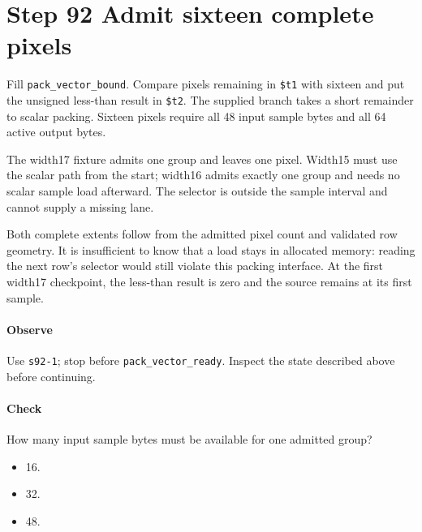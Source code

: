 \section{Step 92 Admit sixteen complete pixels}
Fill \texttt{pack\_vector\_bound}. Compare pixels remaining in \texttt{\$t1} with sixteen and put the unsigned less-than result in \texttt{\$t2}. The supplied branch takes a short remainder to scalar packing. Sixteen pixels require all 48 input sample bytes and all 64 active output bytes.

The width17 fixture admits one group and leaves one pixel. Width15 must use the scalar path from the start; width16 admits exactly one group and needs no scalar sample load afterward. The selector is outside the sample interval and cannot supply a missing lane.

Both complete extents follow from the admitted pixel count and validated row geometry. It is insufficient to know that a load stays in allocated memory: reading the next row’s selector would still violate this packing interface. At the first width17 checkpoint, the less-than result is zero and the source remains at its first sample.

\paragraph{Observe} Use \texttt{s92-1}; stop before \texttt{pack\_vector\_ready}. Inspect the state described above before continuing.

\paragraph{Check} How many input sample bytes must be available for one admitted group?
\begin{itemize}
  \item[A.] 16.
  \item[B.] 32.
  \item[C.] 48.
\end{itemize}
